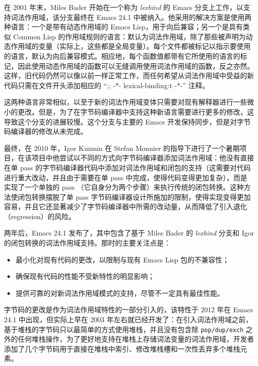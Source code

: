 \documentclass[format=acmsmall,screen]{acmart}
\begin{document}
在 2001 年末，Miles Bader 开始在一个称为 \emph{lexbind} 的 Emacs 分支上工作，以支持词法作用域，该分支最终在 Emacs 24.1 中被纳入。他采用的解决方案是使用两种语言：一个是带有动态作用域的 Emacs Lisp，用于向后兼容；另一个是具有类似 Common Lisp 的作用域规则的语言：默认为词法作用域，除了那些被声明为动态作用域的变量（实际上，这些都是全局变量）。每个文件都被标记以指示要使用的语言，默认为向后兼容模式。相应地，每个函数值都带有它所使用的语言的标记，因此使用动态作用域的函数可以无缝调用使用词法作用域的函数，反之亦然。这样，旧代码仍然可以像以前一样正常工作，而任何希望从词法作用域中受益的新代码只需在文件开头添加相应的 ``;; -*- lexical-binding:t -*-'' 注释。

这两种语言非常相似，以至于新的词法作用域变体只需要对现有解释器进行一些微小的更改。但是，为了在字节码编译器中支持这种新语言需要进行更多的修改，这导致这个分支的进展较慢。这个分支与主要的 Emacs 开发保持同步，但是对字节码编译器的修改从未完成。

最终，在 2010 年，Igor Kuzmin 在 Stefan Monnier 的指导下进行了一个暑期项目，在该项目中他尝试以不同的方式向字节码编译器添加词法作用域：他没有直接在单 pass 的字节码编译器代码中添加对词法作用域和闭包的支持（这需要对代码进行重大改动，并且由于需要在单 pass 中完成，使得代码变得更加复杂），而是实现了一个单独的 pass （它自身分为两个步骤）来执行传统的闭包转换。这种方法使闭包转换摆脱了单 pass 字节码编译器设计所施加的限制，使得实现变得更加容易，并且它还显著减少了字节码编译器中所需的改动量，从而降低了引入退化（regression）的风险。

两年后，Emacs 24.1 发布了，其中包含了基于 Miles Bader 的 \emph{lexbind} 分支和 Igor 的闭包转换的词法作用域支持。那时的主要关注点是：
\begin{itemize}
\item 最小化对现有代码的更改，以限制与现有 Emacs Lisp 包的不兼容性；
\item 确保现有代码的性能不受新特性的明显影响；
\item 提供可靠的对新词法作用域模式的支持，尽管不一定具有最佳性能。
\end{itemize}

字节码的更改是作为词法作用域特性的一部分引入的，该特性于 2012 年在 Emacs 24.1 中出现，但实际上早在 2003 年左右就已经开发了：在引入词法作用域之前，基于堆栈的字节码只以最简单的方式使用堆栈，并且没有包含除 \texttt{pop/dup/exch} 之外的任何堆栈操作，为了更好地支持在堆栈上存储词法变量的词法作用域，开发者添加了几个字节码用于直接在堆栈中索引、修改堆栈槽和一次性丢弃多个堆栈元素。
\end{document}
